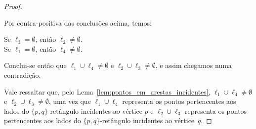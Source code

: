 \begin{proof}
\begin{figure}[H]
\begin{minipage}[t]{0.4\textwidth}
\begin{figure}[H]
\begin{adjustbox}{valign=t, raise=-55pt}
            \end{adjustbox}
            \label{fig:tikz-captions}
        \end{figure}
    \end{minipage}
    \vfill %
    \label{fig:chaves-buscas}
\end{figure}

Por contra-positiva das conclusões acima, temos:
\begin{center}
Se $\ell_3 = \emptyset$, então $\ell_2 \neq \emptyset$. \\
Se $\ell_1 = \emptyset$, então $\ell_4 \neq \emptyset$.
\end{center}

Conclui-se então que $\ell_1 \cup \ell_4  \neq \emptyset$ e $\ell_2 \cup \ell_3  \neq \emptyset$, e assim chegamos numa contradição.

Vale ressaltar que, pelo Lema~\ref{lem:pontos_em_arestas_incidentes}, $\ell_1 \cup \ell_4  \neq \emptyset$ e $\ell_2 \cup \ell_3  \neq \emptyset$, uma vez que $\ell_1 \cup \ell_4$ representa os pontos pertencentes aos lados do $\{p,q\}$-retângulo incidentes ao vértice $p$ e  $\ell_2 \cup \ell_3$ representa os pontos pertencentes aos lados do $\{p,q\}$-retângulo incidentes ao vértice~$q$.
\end{proof}

